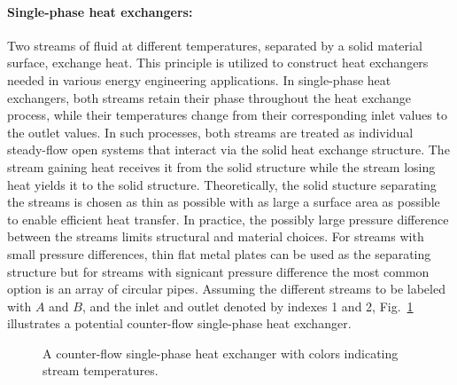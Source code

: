 \paragraph{Single-phase heat exchangers:}
Two streams of fluid at different temperatures, separated by a solid material surface, exchange heat. This principle is utilized to construct heat exchangers needed in various energy engineering applications. In single-phase heat exchangers, both streams retain their phase throughout the heat exchange process, while their temperatures change from their corresponding inlet values to the outlet values. In such processes, both streams are treated as individual steady-flow open systems that interact via the solid heat exchange structure. The stream gaining heat receives it from the solid structure while the stream losing heat yields it to the solid structure. Theoretically, the solid stucture separating the streams is chosen as thin as possible with as large a surface area as possible to enable efficient heat transfer. In practice, the possibly large pressure difference between the streams limits structural and material choices. For streams with small pressure differences, thin flat metal plates can be used as the separating structure but for streams with signicant pressure difference the most common option is an array of circular pipes. Assuming the different streams to be labeled with $A$ and $B$, and the inlet and outlet denoted by indexes 1 and 2, Fig.~\ref{fig:heat-exchanger} illustrates a potential counter-flow single-phase heat exchanger.
\begin{figure}[!htb]
    \centering
    
    \caption{A counter-flow single-phase heat exchanger with colors indicating stream temperatures.}
    \label{fig:heat-exchanger}
\end{figure}

